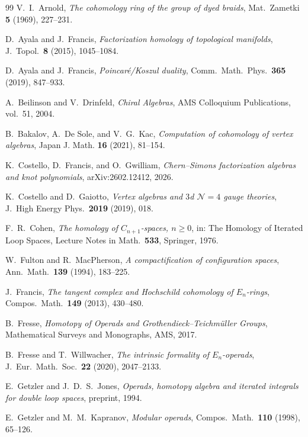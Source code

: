 \documentclass[11pt,reqno]{amsart}
\theoremstyle{definition}
\theoremstyle{remark}
\providecommand{\En}{E_n}
\providecommand{\cN}{\mathcal{N}}
\begin{document}
\begin{thebibliography}{99}
 V.~I.~Arnold, \emph{The cohomology ring of the
 group of dyed braids}, Mat.\ Zametki \textbf{5} (1969), 227--231.

 D.~Ayala and J.~Francis, \emph{Factorization homology of
 topological manifolds}, J.\ Topol.\ \textbf{8} (2015), 1045--1084.

 D.~Ayala and J.~Francis, \emph{Poincar\'e/Koszul
 duality}, Comm.\ Math.\ Phys.\ \textbf{365} (2019), 847--933.

 A.~Beilinson and V.~Drinfeld, \emph{Chiral Algebras},
 AMS Colloquium Publications, vol.~51, 2004.

 B.~Bakalov, A.~De Sole, and V.~G.~Kac,
 \emph{Computation of cohomology of vertex algebras},
 Japan J. Math. \textbf{16} (2021), 81--154.

 K.~Costello, D.~Francis, and O.~Gwilliam,
 \emph{Chern--Simons factorization algebras and knot polynomials},
 arXiv:2602.12412, 2026.

 K.~Costello and D.~Gaiotto, \emph{Vertex
 algebras and $3$d $\cN=4$ gauge theories}, J.\ High Energy Phys.\
 \textbf{2019} (2019), 018.

 F.~R.~Cohen, \emph{The homology of
 $C_{n+1}$-spaces, $n \ge 0$}, in: The Homology of Iterated Loop
 Spaces, Lecture Notes in Math.\ \textbf{533}, Springer, 1976.

 W.~Fulton and R.~MacPherson, \emph{A compactification
 of configuration spaces}, Ann.\ Math.\ \textbf{139} (1994), 183--225.

 J.~Francis, \emph{The tangent complex and
 Hochschild cohomology of $\En$-rings}, Compos.\ Math.\ \textbf{149}
 (2013), 430--480.

 B.~Fresse, \emph{Homotopy of Operads and
 Grothendieck--Teichm\"uller Groups}, Mathematical Surveys and
 Monographs, AMS, 2017.

 B.~Fresse and T.~Willwacher,
 \emph{The intrinsic formality of $\En$-operads}, J.\ Eur.\ Math.\
 Soc.\ \textbf{22} (2020), 2047--2133.

 E.~Getzler and J.~D.~S.~Jones, \emph{Operads, homotopy
 algebra and iterated integrals for double loop spaces}, preprint,
 1994.

 E.~Getzler and M.~M.~Kapranov, \emph{Modular operads},
 Compos.\ Math.\ \textbf{110} (1998), 65--126.


\end{thebibliography}
\end{document}
